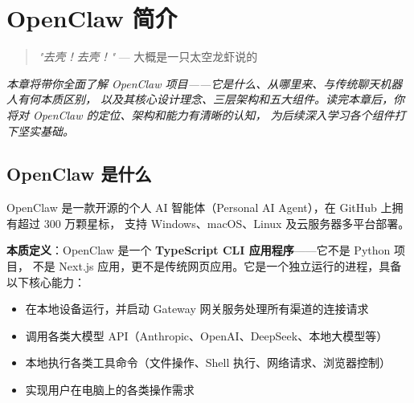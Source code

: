 \chapter{OpenClaw 简介}

\begin{quote}
\textit{"去壳！去壳！"} — 大概是一只太空龙虾说的
\end{quote}

\noindent\textit{本章将带你全面了解 OpenClaw 项目——它是什么、从哪里来、与传统聊天机器人有何本质区别，
以及其核心设计理念、三层架构和五大组件。读完本章后，你将对 OpenClaw 的定位、架构和能力有清晰的认知，
为后续深入学习各个组件打下坚实基础。}

\section{OpenClaw 是什么}

OpenClaw 是一款开源的个人 AI 智能体（Personal AI Agent），在 GitHub 上拥有超过 300 万颗星标，
支持 Windows、macOS、Linux 及云服务器多平台部署。

\vspace{-0.5em}
\begin{center}
\end{center}

\noindent \textbf{本质定义}：OpenClaw 是一个 \textbf{TypeScript CLI 应用程序}——它不是 Python 项目，
不是 Next.js 应用，更不是传统网页应用。它是一个独立运行的进程，具备以下核心能力：

\begin{itemize}
  \item 在本地设备运行，并启动 Gateway 网关服务处理所有渠道的连接请求
  \item 调用各类大模型 API（Anthropic、OpenAI、DeepSeek、本地大模型等）
  \item 本地执行各类工具命令（文件操作、Shell 执行、网络请求、浏览器控制）
  \item 实现用户在电脑上的各类操作需求
\end{itemize}

